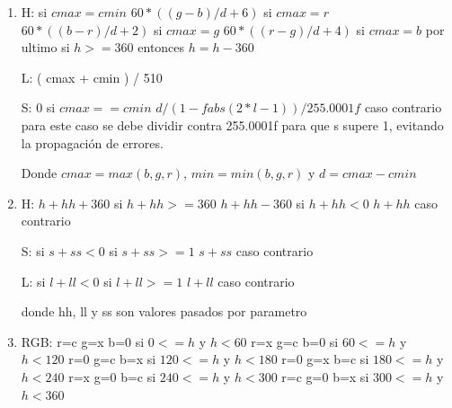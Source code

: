 \documentclass[a4paper]{article}
\begin{document}
\begin{enumerate}
	\item 
		H:  si $cmax = cmin$\newline
		$60 * ( (g-b)/d + 6 )$ si $cmax = r$\newline
		$60 * ( (b-r)/d + 2 )$ si $cmax = g$\newline
		$60 * ( (r-g)/d + 4 )$ si $cmax = b$\newline
		por ultimo si $h >= 360$ entonces $h = h - 360$\newline

		L: ( cmax + cmin ) / 510\newline

		S:\newline
		$0$ si $cmax == cmin$\newline
		$d / ( 1 - fabs( 2*l - 1 ) ) / 255.0001f$ caso contrario\newline
	  para este caso se debe dividir contra 255.0001f para que s supere 1, evitando la propagación de errores.\newline

		Donde $cmax = max(b,g,r)$, $min = min(b,g,r)$ y $d = cmax - cmin$\newline
	
	\item 
		H:\newline
		$h + hh + 360$ si $h+hh >= 360$\newline
		$h + hh - 360$ si $h+hh < 0$\newline
		$h + hh$ caso contrario\newline

		S: si $s+ss < 0$ si $s+ss >= 1$\newline
		$s + ss$ caso contrario\newline

		L: si $l+ll < 0$ si $l+ll >= 1 $\newline
		$l+ll$ caso contrario\newline

		donde hh, ll y ss son valores pasados por parametro
		\newpage

	\item
		RGB:\newline
			r=c g=x b=0 si $0<=h$ y $h<60$\newline
			r=x g=c b=0 si $60<=h$ y $h<120$\newline
			r=0 g=c b=x si $120<=h$ y $h<180$\newline
			r=0 g=x b=c si $180<=h$ y $h<240$\newline
			r=x g=0 b=c si $240<=h$ y $h<300$\newline
			r=c g=0 b=x si $300<=h$ y $h<360$\newline


\end{enumerate}
\end{document}
